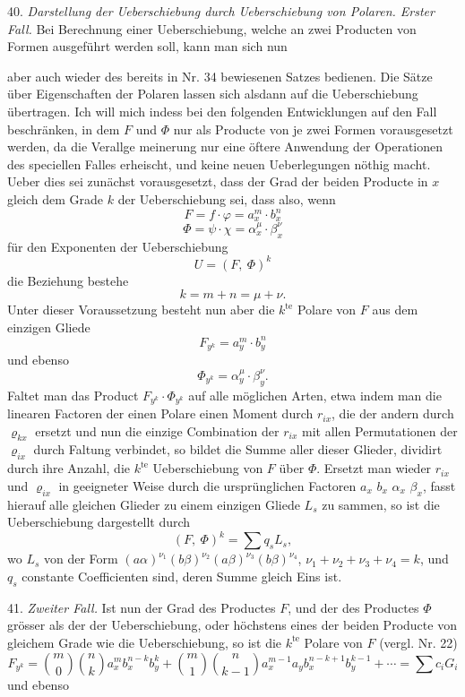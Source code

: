\documentclass[11pt]{article}
\providecommand{\weberpage}[1]{}
\let\Phi\varPhi
\begin{document}
40. \textit{Darstellung der Ueberschiebung durch Ueberschiebung von
Polaren. Erster Fall.} Bei Berechnung einer Ueberschiebung, welche
an zwei Producten von Formen ausgeführt werden soll, kann man
sich nun


\weberpage{42}
aber auch wieder des bereits in Nr. 34 bewiesenen Satzes bedienen.
Die Sätze über Eigenschaften der Polaren lassen sich alsdann auf die
Ueberschiebung übertragen. Ich will mich indess bei den folgenden
Entwicklungen auf den Fall beschränken, in dem $F$ und $\Phi$ nur als
Producte von je zwei Formen vorausgesetzt werden, da die Verallge\-
meinerung nur eine öftere Anwendung der Operationen des speciellen
Falles erheischt, und keine neuen Ueberlegungen nöthig macht. Ueber\-
dies sei zunächst vorausgesetzt, dass der Grad der beiden Producte
in $x$ gleich dem Grade $k$ der Ueberschiebung sei, dass also, wenn
\[
F = f\cdot\varphi = a_x^m\cdot b_x^n
\]
\[
\Phi = \psi\cdot\chi = \alpha_x^\mu\cdot\beta_x^\nu
\]
für den Exponenten der Ueberschiebung
\[
U = (F,\ \Phi)^k
\]
die Beziehung bestehe
\[
k = m+n = \mu+\nu.
\]
Unter dieser Voraussetzung besteht nun aber die $k^{\text{te}}$ Polare von
$F$ aus dem einzigen Gliede
\[
F_{y^k} = a_y^m\cdot b_y^n
\]
und ebenso
\[
\Phi_{y^k} = \alpha_y^\mu\cdot\beta_y^\nu.
\]
Faltet man das Product $F_{y^k}\cdot \Phi_{y^k}$ auf alle möglichen Arten, etwa
indem man die linearen Factoren der einen Polare einen Moment durch
$r_{ix}$, die der andern durch $\varrho_{kx}$ ersetzt und nun die einzige Combination
der $r_{ix}$ mit allen Permutationen der $\varrho_{ix}$ durch Faltung verbindet, so
bildet die Summe aller dieser Glieder, dividirt durch ihre Anzahl, die
$k^{\text{te}}$ Ueberschiebung von $F$ über $\Phi$. Ersetzt man wieder $r_{ix}$ und $\varrho_{ix}$
in geeigneter Weise durch die ursprünglichen Factoren $a_x$ $b_x$ $\alpha_x$ $\beta_x$,
fasst hierauf alle gleichen Glieder zu einem einzigen Gliede $L_s$ zu\-
sammen, so ist die Ueberschiebung dargestellt durch
\[
(F,\ \Phi)^k = \sum q_s L_s,
\]
wo $L_s$ von der Form $(a\alpha)^{\nu_1}(b\beta)^{\nu_2}(a\beta)^{\nu_3}(b\beta)^{\nu_4}$, $\nu_1+\nu_2+\nu_3+\nu_4=k$,
und $q_s$ constante Coefficienten sind, deren Summe gleich Eins ist.

41. \textit{Zweiter Fall.} Ist nun der Grad des Productes $F$, und der
des Productes $\Phi$ grösser als der der Ueberschiebung, oder höchstens
eines der beiden Producte von gleichem Grade wie die Ueberschiebung,
so ist die $k^{\text{te}}$ Polare von $F$ (vergl. Nr. 22)
\[
F_{y^k} = \binom{m}{0}\binom{n}{k} a_x^m b_x^{n-k} b_y^k + \binom{m}{1}\binom{n}{k-1} a_x^{m-1} a_y b_x^{n-k+1} b_y^{k-1} + \cdots = \sum c_i G_i
\]
und ebenso
\end{document}
